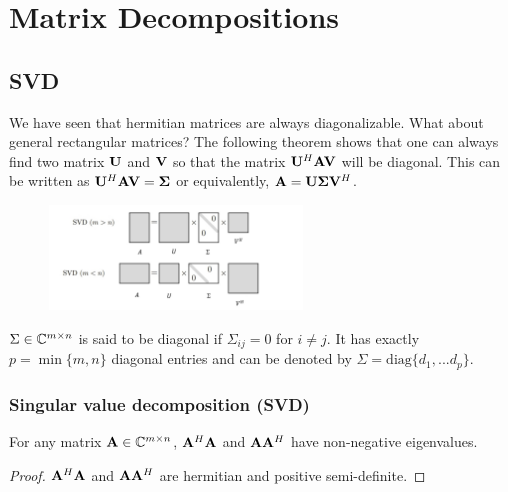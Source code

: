 \chapter{Matrix Decompositions}

\section{SVD}

We have seen that hermitian matrices are always diagonalizable. What about general rectangular matrices?
The following theorem shows that one can always find two matrix $\bold{U}$ and $\bold{V}$
so that the matrix $\bold{U}^H\bold{A}\bold{V}$ will be diagonal. This can be written as 
$\bold{U}^H\bold{A}\bold{V} = \bold{\Sigma }$ or equivalently, $\bold{A} = \bold{U}\bold{\Sigma }\bold{V}^H$.

\begin{figure}[htbp]
    \centering
    \includegraphics[width=0.6\textwidth]{figure/svd1.png}
    \caption{}
\end{figure}

\begin{remark}
    $\Sigma\in\mathbb{C}^{m\times n}$ is said to be diagonal if $\Sigma_{ij}=0$ for $i\neq j$.
    It has exactly $p=\min \{m,n\}$ diagonal entries and can be denoted by $\Sigma=\text{diag}\{d_1,...d_p\}$.
\end{remark}


\subsection{Singular value decomposition (SVD)}

\begin{proposition}{}{}
    For any matrix $\bold{A}\in \mathbb{C}^{m\times n}$, 
    $\bold{A}^H\bold{A}$ and $\bold{A}\bold{A}^H$ have non-negative eigenvalues.
\end{proposition}

\begin{proof}
    $\bold{A}^H\bold{A}$ and $\bold{A}\bold{A}^H$ are hermitian and positive semi-definite.
\end{proof}

